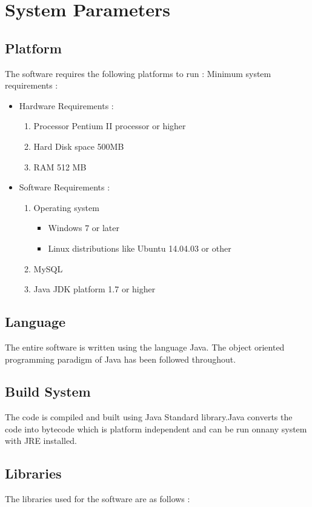 \documentclass[a4paper]{article}
\begin{document}
\section{System Parameters}
\subsection{Platform}
The software requires the following platforms to run :
Minimum system requirements :
\begin{itemize}
\item Hardware Requirements :
	\begin {enumerate}
	\item Processor Pentium II processor or higher
	\item Hard Disk space 500MB
	\item RAM 512 MB
	\end{enumerate}
\item Software Requirements :
	\begin{enumerate}
	\item Operating system
		\begin{itemize}
		\item  Windows 7 or later
		\item Linux distributions like Ubuntu 14.04.03 or other
		\end{itemize}
	\item MySQL
	\item Java JDK platform 1.7 or higher
	\end{enumerate}
\end {itemize}
\subsection{Language}
The entire software is written using the language Java.
The object oriented programming paradigm of Java has been followed throughout.
\subsection{Build System}
The code is compiled and built using Java Standard library.Java converts the code into bytecode which is platform independent and can be run onnany system with JRE installed.

\subsection{Libraries}
The libraries used for the software are as follows :
\end{document}
